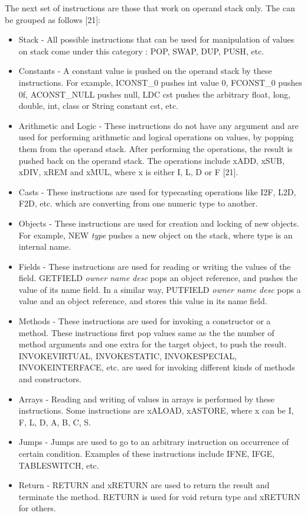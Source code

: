 The next set of instructions are those that work on operand stack only. The can be grouped as follows [21]:

\begin{itemize}
\item Stack - All possible instructions that can be used for manipulation of values on stack come under this category : POP, SWAP, DUP, PUSH, etc.
\item Constants - A constant value is pushed on the operand stack by these instructions. For example, ICONST{\_}0 pushes int value 0, FCONST{\_}0 pushes 0f, ACONST{\_}NULL pushes null, LDC cst pushes the arbitrary float, long, double, int, class or String constant cst, etc.
\item Arithmetic and Logic - These instructions do not have any argument and are used for performing arithmetic and logical operations on values, by popping them from the operand stack. After performing the operations, the result is pushed back on the operand stack. The operations include xADD, xSUB, xDIV, xREM and xMUL, where x is either I, L, D or F [21]. 
\item Casts -  These instructions are used for typecasting operations like I2F, L2D, F2D, etc. which are converting from one numeric type to another. 
\item Objects - These instructions are used for creation and locking of new objects. For example, NEW \textit{type} pushes a new object on the stack, where type is an internal name.
\item Fields - These instructions are used for reading or writing the values of the field. GETFIELD \textit{owner name desc} pops an object reference, and pushes the value of its name field. In a similar way, PUTFIELD \textit{owner name desc} pops a value and an object reference, and stores this value in its name field.
\item Methods - These instructions are used for invoking a constructor or a method. These instructions first pop values same as the the number of method arguments and one extra for the target object, to push the result. INVOKEVIRTUAL, INVOKESTATIC, INVOKESPECIAL, INVOKEINTERFACE, etc. are used for invoking different kinds of methods and constructors.
\item Arrays - Reading and writing of values in arrays is performed by these instructions. Some instructions are xALOAD, xASTORE, where x can be I, F, L, D, A, B, C, S.
\item Jumps - Jumps are used to go to an arbitrary instruction on occurrence of certain condition. Examples of these instructions include IFNE, IFGE, TABLESWITCH, etc.
\item Return - RETURN and xRETURN are used to return the result and terminate the method. RETURN is used for void return type and xRETURN for others.  
\end{itemize}

